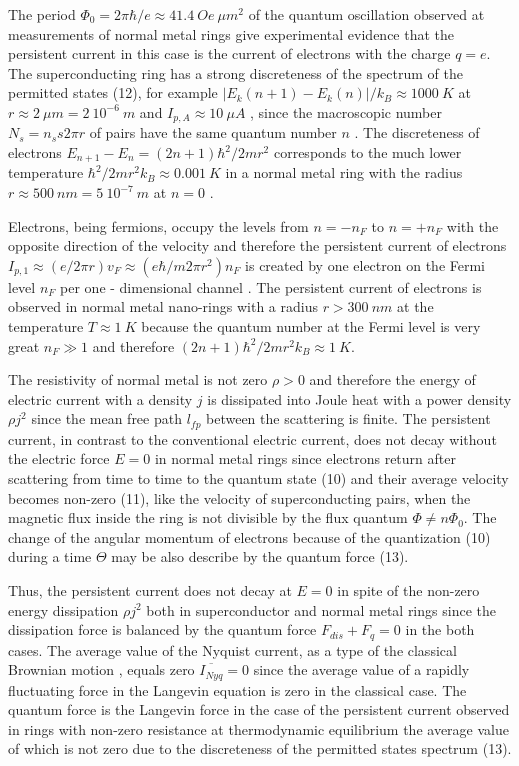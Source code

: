 \documentclass[twocolumn,secnumarabic,amssymb, nobibnotes, aps, prd]{revtex4}
\begin{document}
The period $\Phi _{0} = 2\pi \hbar /e \approx 41.4 \ Oe \ \mu m^{2}$ of the quantum oscillation observed at measurements of normal metal rings \cite{Science2009PC,PRL2009PC} give experimental evidence that the persistent current in this case is the current of electrons with the charge $q = e$. The superconducting ring has a strong discreteness of the spectrum of the permitted states (12), for example $|E_{k}(n+1) - E_{k}(n)|/k_{B} \approx 1000 \ K$ at $r \approx 2 \ \mu m = 2 \ 10^{-6} \ m$ and $I_{p,A} \approx 10 \ \mu A$ \cite{JETP2007}, since the macroscopic number $N_{s} = n_{s}s2\pi r$ of pairs have the same quantum number $n$ \cite{PLA2020}. The discreteness of electrons $E_{n+1} - E_{n} = (2n+1)\hbar ^{2}/2mr^{2}$ corresponds to the much lower temperature $\hbar ^{2}/2mr^{2}k_{B} \approx 0.001 \ K$ in a normal metal ring with the radius $r \approx 500 \ nm = 5 \ 10^{-7} \ m$ at $n = 0$ \cite{PLA2020}. 

Electrons, being fermions, occupy the levels from $n = -n_{F}$ to $n = +n_{F}$ with the opposite direction of the velocity and therefore the persistent current of electrons $I_{p,1} \approx (e/2\pi r)v_{F} \approx (e\hbar/m2\pi r^{2})n_{F} $ is created by one electron on the Fermi level $n _{F}$ per one - dimensional channel \cite{PRB1988tPCNM}. The persistent current of electrons is observed in normal metal nano-rings with a radius $r > 300 \ nm$ at the temperature $T \approx 1 \ K$ \cite{Science2009PC,PRL2009PC} because the quantum number at the Fermi level is very great $n_{F} \gg 1$ and therefore $(2n+1)\hbar ^{2}/2mr^{2}k _{B} \approx 1 \ K$. 

The resistivity of normal metal is not zero $\rho > 0$ and therefore the energy of electric current with a density $j$ is dissipated into Joule heat with a power density $\rho j^{2}$ since the mean free path $l_{fp}$ between the scattering is finite. The persistent current, in contrast to the conventional electric current, does not decay without the electric force $E = 0$ in normal metal rings \cite{Science2009PC,PRL2009PC} since electrons return after scattering from time to time to the quantum state (10) and their average velocity becomes non-zero (11), like the velocity of superconducting pairs, when the magnetic flux inside the ring is not divisible by the flux quantum $\Phi \neq n\Phi_{0}$. The change of the angular momentum of electrons because of the quantization (10) during a time $\Theta $ may be also describe by the quantum force (13).  

Thus, the persistent current does not decay at $E = 0$ in spite of the non-zero energy dissipation $\rho j^{2}$ both in superconductor and normal metal rings since the dissipation force is balanced by the quantum force $F_{dis} + F_{q} = 0$ in the both cases. The average value of the Nyquist current, as a type of the classical Brownian motion \cite{Feynman}, equals zero $\overline{I_{Nyq}}  = 0$ since the average value of a rapidly fluctuating force in the Langevin equation \cite{Langevin1908} is zero in the classical case. The quantum force is the Langevin force in the case of the persistent current observed in rings with non-zero resistance at thermodynamic equilibrium the average value of which is not zero due to the discreteness of the permitted states spectrum (13).  
\end{document}
